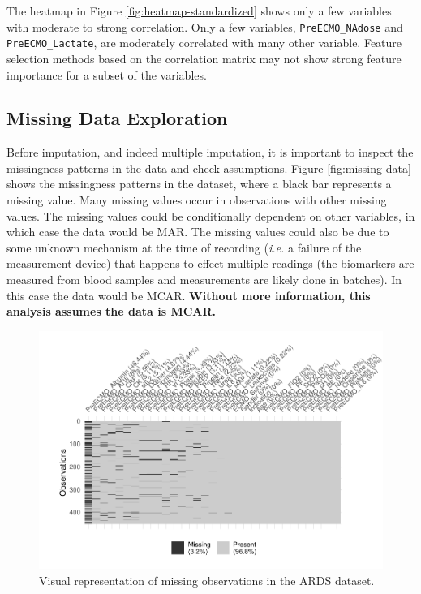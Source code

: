 \documentclass[12pt,]{article}
\begin{document}
The heatmap in Figure \ref{fig:heatmap-standardized} shows only a few
variables with moderate to strong correlation. Only a few variables,
\texttt{PreECMO\_NAdose} and \texttt{PreECMO\_Lactate}, are moderately
correlated with many other variable. Feature selection methods based on
the correlation matrix may not show strong feature importance for a
subset of the variables.

\subsection{Missing Data Exploration}\label{missing-data-exploration}

Before imputation, and indeed multiple imputation, it is important to
inspect the missingness patterns in the data and check assumptions.
Figure \ref{fig:missing-data} shows the missingness patterns in the
dataset, where a black bar represents a missing value. Many missing
values occur in observations with other missing values. The missing
values could be conditionally dependent on other variables, in which
case the data would be MAR. The missing values could also be due to some
unknown mechanism at the time of recording (\emph{i.e.} a failure of the
measurement device) that happens to effect multiple readings (the
biomarkers are measured from blood samples and measurements are likely
done in batches). In this case the data would be MCAR. \textbf{Without
more information, this analysis assumes the data is MCAR.}

\begin{figure}[H]

{\centering \includegraphics[width=1\linewidth]{figure/graphics-unnamed-chunk-4-1} 

}

\caption{\label{fig:missing-data}Visual representation of missing observations in the ARDS dataset.}\label{fig:unnamed-chunk-4}
\end{figure}
\end{document}

